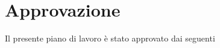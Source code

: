 \section{Approvazione}
Il presente piano di lavoro è stato approvato dai seguenti

\noindent

\vspace*{4cm}


    


\vspace{1in}
\vspace{1in}

\begin{flushright}
\dataApprovazione
\end{flushright}
